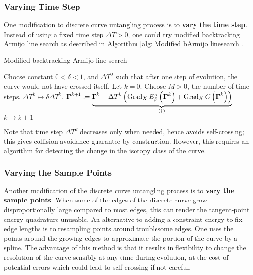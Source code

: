 \documentclass[../dissertation.tex]{subfiles}
\begin{document}
\subsubsection{Varying Time Step}
One modification to discrete curve untangling process is to \textbf{vary the time step}.
Instead of using a fixed time step $\Delta T > 0$, one could try modified backtracking Armijo line search\cite{doi:10.1137/1.9781611971200.ch6} as described in Algorithm \ref{alg: Modified bArmijo linesearch}.
\begin{algorithm}[tbp]
    \caption{Modified backtracking Armijo line search}
    \label{alg: Modified bArmijo linesearch}
    \begin{algorithmic}
        \State Choose constant $0 < \delta < 1$, and $\Delta T^0$ such that after one step of evolution, the curve would not have crossed itself.
        \State Let $k = 0$.
        \State Choose $M > 0$, the number of time steps.
            \State $\Delta T^k \mapsto \delta \Delta T^k$.
            \Else
            \State $\boldsymbol{\Gamma}^{k+1} \coloneqq \underbrace{\boldsymbol{\Gamma}^k - \Delta T^k \left( \operatorname{Grad}_X E_{\beta}^{\alpha} \left( \boldsymbol{\Gamma}^k \right) + \operatorname{Grad}_X C \left( \boldsymbol{\Gamma}^k \right)\right)}_{(\dag)}$
            \State $k \mapsto k + 1$
            \EndIf
        \EndWhile
    \end{algorithmic}
\end{algorithm}
Note that time step $\Delta T^k$ decreases only when needed, hence avoids self-crossing;
this gives collision avoidance guarantee by construction\cite{YSC2021}.
However, this requires an algorithm for detecting the change in the isotopy class of the curve.

\subsubsection{Varying the Sample Points}
Another modification of the discrete curve untangling process is to \textbf{vary the sample points}.
When some of the edges of the discrete curve grow disproportionally large compared to most edges,
this can render the tangent-point energy quadrature unusable.
An alternative to adding a constraint energy to fix edge lengths is to resampling points around troublesome edges.
One uses the points around the growing edges to approximate the portion of the curve by a spline. The advantage of this method is that it results in flexibility to change the resolution of the curve sensibly at any time during evolution, at the cost of potential errors which could lead to self-crossing if not careful.
\end{document}
